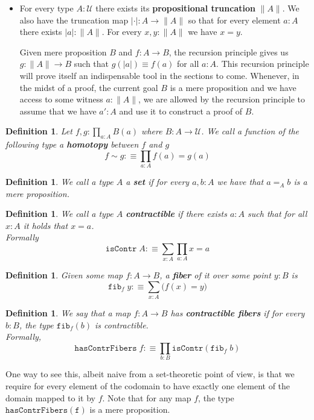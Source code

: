 \documentclass[12pt]{report}
\newtheorem{defn}[thm]{Definition}
\begin{document}
\begin{itemize}
	\item For every type $A : \mathcal{U}$ there exists its \textbf{propositional truncation} $\| A \|$. 
	We also have the truncation map $|\cdot| : A \rightarrow \lVert A \rVert$ so that for every element $a : A$ there exists $|a| : \| A\|$. 
	For every $x, y : \| A\|$ we have $x = y$. 

	Given mere proposition $B$ and $f : A \rightarrow B$, the recursion principle gives us $g : \|A\| \rightarrow B$ such that $g(|a|) \equiv f(a)$ for all $a : A$.
	This recursion principle will prove itself an indispensable tool in the sections to come. 
	Whenever, in the midst of a proof, the current goal $B$ is a mere proposition and we have access to some witness $a : \lVert A \rVert$, we are allowed by the recursion principle to assume that we have $a' : A$ and use it to construct a proof of $B$.
\end{itemize}
	\begin{defn}
	Let $f,g : \prod_{a:A}B(a)$ where $B :A \rightarrow \mathcal{U}$. 
	We call a function of the following type a \textbf{homotopy} between $f$ and $g$
	$$f\sim g :\equiv \prod_{a:A}f(a) = g(a)$$
	\end{defn}

	\begin{defn}
	We call a type $A$ a \textbf{set} if for every $a,b : A$ we have that $a =_A b$ is a mere proposition.
	\end{defn}

	\begin{defn}
	We call a type $A$ \textbf{contractible} if there exists $a : A$ such that for all $x : A$ it holds that $x = a$.\\
	Formally
	$$\mathtt{isContr}\; A :\equiv \sum_{x : A}\prod_{a :A}x=a$$
	\end{defn}

	\begin{defn}
	Given some map $f : A \rightarrow B$, a \textbf{fiber} of it over some point $y : B$ is
	$$\mathtt{fib}_f\; y :\equiv \sum_{x : A} \big(f(x) = y\big)$$
	\end{defn}

	\begin{defn}
	We say that a map $f : A\rightarrow B$ has \textbf{contractible fibers} if for every $b : B$, the type $\mathtt{fib}_f(b)$ is contractible.\\
	Formally, 
	$$ \mathtt{hasContrFibers}\; f : \equiv \prod_{b : B} \mathtt{isContr}(\mathtt{fib}_f\; b)$$
 	\end{defn}
 	One way to see this, albeit naive from a set-theoretic point of view, is that we require for every element of the codomain to have exactly one element of the domain mapped to it by $f$. 
 	Note that for any map $f$, the type $\mathtt{hasContrFibers(f)}$ is a mere proposition. 
\end{document}
